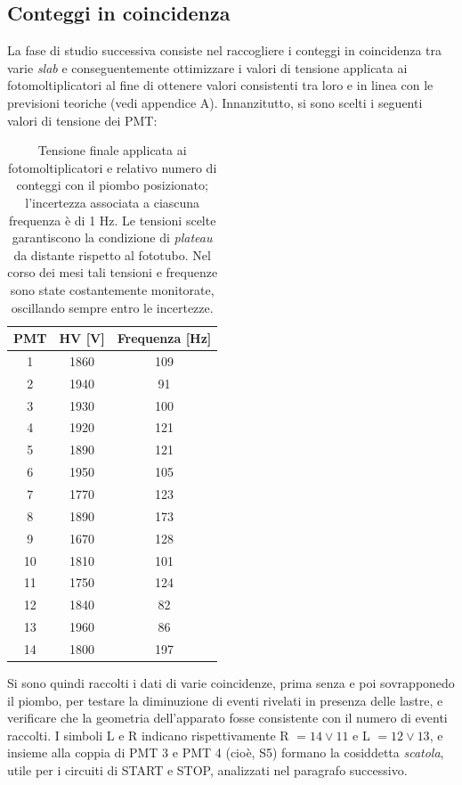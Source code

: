 \documentclass[10pt, oneside, a4paper]{article}   	%
\begin{document}
\subsection{Conteggi in coincidenza}
La fase di studio successiva consiste nel raccogliere i conteggi in coincidenza tra varie \emph{slab} e conseguentemente ottimizzare i valori di tensione applicata ai fotomoltiplicatori al fine di ottenere valori consistenti tra loro e in linea con le previsioni teoriche (vedi appendice A). 
Innanzitutto, si sono scelti i seguenti valori di tensione dei PMT: 
\begin{table}[H]
		\centering
	\begin{tabular}{ccc}
		\toprule
		PMT	&	HV [V]	&	Frequenza [Hz]\\	
		\midrule
		1	&	1860	&	109	\\
		2	&	1940	&	91	\\
		3	&	1930	&	100	\\
		4	&	1920	&	121	\\
		5	&	1890	&	121	\\
		6	&	1950	&	105	\\
		7	&	1770	&	123	\\
		8	&	1890	&	173	\\
		9	&	1670	&	128	\\
		10	&	1810	&	101	\\
		11	&	1750	&	124	\\
		12	&	1840	&	82	\\
		13	&	1960	&	86	\\
		14	&	1800	&	197	\\
		\bottomrule
	\end{tabular}
	\caption{Tensione finale applicata ai fotomoltiplicatori e relativo numero di conteggi con il piombo posizionato; l'incertezza associata a ciascuna frequenza è di 1 Hz. Le tensioni scelte garantiscono la condizione di \emph{plateau} da distante rispetto al fototubo. Nel corso dei mesi tali tensioni e frequenze sono state costantemente monitorate, oscillando sempre entro le incertezze.}
	\label{HV_counts}
\end{table}
Si sono quindi raccolti i dati di varie coincidenze, prima senza e poi sovrapponedo il piombo, per testare la diminuzione di eventi rivelati in presenza delle lastre, e verificare che la geometria dell'apparato fosse consistente con il numero di eventi raccolti. I simboli L e R indicano rispettivamente R $= 14 \vee 11 $ e L $= 12 \vee 13$, e insieme alla coppia di PMT 3 e PMT 4 (cioè, S5) formano la cosiddetta \emph{scatola}, utile per i circuiti di START e STOP, analizzati nel paragrafo successivo.
\end{document}
